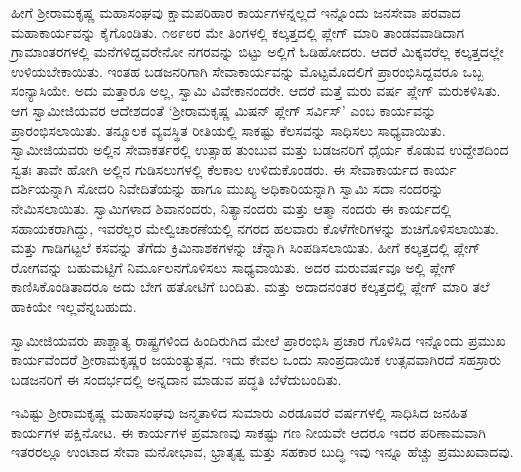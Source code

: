 ಹೀಗೆ ಶ್ರೀರಾಮಕೃಷ್ಣ ಮಹಾಸಂಘವು ಕ್ಷಾಮಪರಿಹಾರ ಕಾರ್ಯಗಳನ್ನಲ್ಲದೆ ಇನ್ನೊಂದು ಜನಸೇವಾ ಪರವಾದ ಮಹಾಕಾರ್ಯವನ್ನು ಕೈಗೊಂಡಿತು. ೧೮೯೮ರ ಮೇ ತಿಂಗಳಲ್ಲಿ ಕಲ್ಕತ್ತದಲ್ಲಿ ಪ್ಲೇಗ್ ಮಾರಿ ತಾಂಡವವಾಡಿದಾಗ ಗ್ರಾಮಾಂತರಗಳಲ್ಲಿ ಮನೆಗಳಿದ್ದವರೇನೋ ನಗರವನ್ನು ಬಿಟ್ಟು ಅಲ್ಲಿಗೆ ಓಡಿಹೋದರು. ಆದರೆ ಮಿಕ್ಕವರೆಲ್ಲ ಕಲ್ಕತ್ತದಲ್ಲೇ ಉಳಿಯಬೇಕಾಯಿತು. ಇಂತಹ ಬಡಜನರಿಗಾಗಿ ಸೇವಾಕಾರ್ಯವನ್ನು ಮೊಟ್ಟಮೊದಲಿಗೆ ಪ್ರಾರಂಭಿಸಿದ್ದವರೂ ಒಬ್ಬ ಸಂನ್ಯಾಸಿಯೇ. ಅದು ಮತ್ತಾರೂ ಅಲ್ಲ, ಸ್ವಾಮಿ ವಿವೇಕಾನಂದರೇ. ಆದರೆ ಮತ್ತೆ ಮರು ವರ್ಷ ಪ್ಲೇಗ್ ಮರುಕಳಿಸಿತು. ಆಗ ಸ್ವಾಮೀಜಿಯವರ ಆದೇಶದಂತೆ ‘ಶ್ರೀರಾಮಕೃಷ್ಣ ಮಿಷನ್ ಪ್ಲೇಗ್ ಸರ್ವಿಸ್​’ ಎಂಬ ಕಾರ್ಯವನ್ನು ಪ್ರಾರಂಭಿಸಲಾಯಿತು. ತನ್ಮೂಲಕ ವ್ಯವಸ್ಥಿತ ರೀತಿಯಲ್ಲಿ ಸಾಕಷ್ಟು ಕೆಲಸವನ್ನು ಸಾಧಿಸಲು ಸಾಧ್ಯವಾಯಿತು. ಸ್ವಾಮೀಜಿಯವರು ಅಲ್ಲಿನ ಸೇವಾಕರ್ತರಲ್ಲಿ ಉತ್ಸಾಹ ತುಂಬುವ ಮತ್ತು ಬಡಜನರಿಗೆ ಧೈರ್ಯ ಕೊಡುವ ಉದ್ದೇಶದಿಂದ ಸ್ವತಃ ತಾವೇ ಹೋಗಿ ಅಲ್ಲಿನ ಗುಡಿಸಲುಗಳಲ್ಲಿ ಕೆಲಕಾಲ ಉಳಿದುಕೊಂಡರು. ಈ ಸೇವಾಕಾರ್ಯದ ಕಾರ್ಯ ದರ್ಶಿಯನ್ನಾಗಿ ಸೋದರಿ ನಿವೇದಿತೆಯನ್ನು ಹಾಗೂ ಮುಖ್ಯ ಅಧಿಕಾರಿಯನ್ನಾಗಿ ಸ್ವಾಮಿ ಸದಾ ನಂದರನ್ನು ನೇಮಿಸಲಾಯಿತು. ಸ್ವಾಮಿಗಳಾದ ಶಿವಾನಂದರು, ನಿತ್ಯಾನಂದರು ಮತ್ತು ಆತ್ಮಾ ನಂದರು ಈ ಕಾರ್ಯದಲ್ಲಿ ಸಹಾಯಕರಾಗಿದ್ದು, ಇವರೆಲ್ಲರ ಮೇಲ್ವಿಚಾರಣೆಯಲ್ಲಿ ನಗರದ ಹಲವಾರು ಕೊಳೆಗೇರಿಗಳನ್ನು ಶುಚಿಗೊಳಿಸಲಾಯಿತು. ಮತ್ತು ಗಾಡಿಗಟ್ಟಲೆ ಕಸವನ್ನು ತೆಗೆದು ಕ್ರಿಮಿನಾಶಕಗಳನ್ನು ಚೆನ್ನಾಗಿ ಸಿಂಪಡಿಸಲಾಯಿತು. ಹೀಗೆ ಕಲ್ಕತ್ತದಲ್ಲಿ ಪ್ಲೇಗ್ ರೋಗವನ್ನು ಬಹುಮಟ್ಟಿಗೆ ನಿರ್ಮೂಲನಗೊಳಿಸಲು ಸಾಧ್ಯವಾಯಿತು. ಅದರ ಮರುವರ್ಷವೂ ಅಲ್ಲಿ ಪ್ಲೇಗ್ ಕಾಣಿಸಿಕೊಂಡಿತಾದರೂ ಅದು ಬೇಗ ಹತೋಟಿಗೆ ಬಂದಿತು. ಮತ್ತು ಅದಾದನಂತರ ಕಲ್ಕತ್ತದಲ್ಲಿ ಪ್ಲೇಗ್ ಮಾರಿ ತಲೆ ಹಾಕಿಯೇ ಇಲ್ಲವೆನ್ನಬಹುದು.

ಸ್ವಾಮೀಜಿಯವರು ಪಾಶ್ಚಾತ್ಯ ರಾಷ್ಟ್ರಗಳಿಂದ ಹಿಂದಿರುಗಿದ ಮೇಲೆ ಪ್ರಾರಂಭಿಸಿ ಪ್ರಚಾರ ಗೊಳಿಸಿದ ಇನ್ನೊಂದು ಪ್ರಮುಖ ಕಾರ್ಯವೆಂದರೆ ಶ್ರೀರಾಮಕೃಷ್ಣರ ಜಯಂತ್ಯುತ್ಸವ. ಇದು ಕೇವಲ ಒಂದು ಸಾಂಪ್ರದಾಯಿಕ ಉತ್ಸವವಾಗಿರದೆ ಸಹಸ್ರಾರು ಬಡಜನರಿಗೆ ಈ ಸಂದರ್ಭದಲ್ಲಿ ಅನ್ನದಾನ ಮಾಡುವ ಪದ್ಧತಿ ಬೆಳೆದುಬಂದಿತು.

ಇವಿಷ್ಟು ಶ್ರೀರಾಮಕೃಷ್ಣ ಮಹಾಸಂಘವು ಜನ್ಮತಾಳಿದ ಸುಮಾರು ಎರಡೂವರೆ ವರ್ಷಗಳಲ್ಲಿ ಸಾಧಿಸಿದ ಜನಹಿತ ಕಾರ್ಯಗಳ ಪಕ್ಷಿನೋಟ. ಈ ಕಾರ್ಯಗಳ ಪ್ರಮಾಣವು ಸಾಕಷ್ಟು ಗಣ ನೀಯವೇ ಆದರೂ ಇದರ ಪರಿಣಾಮವಾಗಿ ಇತರರಲ್ಲೂ ಉಂಟಾದ ಸೇವಾ ಮನೋಭಾವ, ಭ್ರಾತೃತ್ವ ಮತ್ತು ಸಹಕಾರ ಬುದ್ಧಿ ಇವು ಇನ್ನೂ ಹೆಚ್ಚು ಪ್ರಮುಖವಾದವು.

